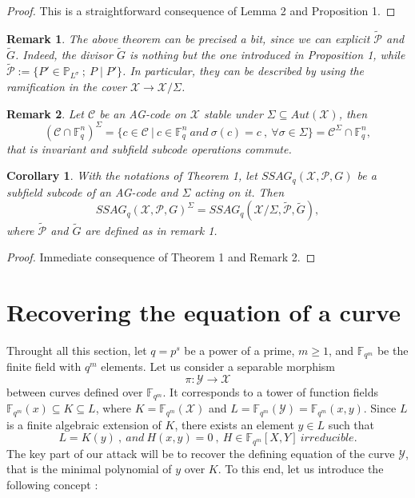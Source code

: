 \documentclass[10pt]{article}
\newtheorem{coro1}{Corollary}[]
\newtheorem{rq1}{Remark}[]
\newcommand{\s}{\vspace{0.3cm}}
\newcommand{\fqm}{\mathbb{F}_{q^m}}
\newcommand{\fq}{\mathbb{F}_q}
\newcommand{\su}{\subseteq}
\newcommand{\X}{\mathcal{X}}
\newcommand{\Y}{\mathcal{Y}}
\newcommand{\PR}{\mathcal{P}}
\begin{document}
\s
 
\begin{proof}
This is a straightforward consequence of Lemma 2 and Proposition 1.
\end{proof}

\s


\begin{rq1} \rm
The above theorem can be precised a bit, since we can explicit $\tilde{\PR}$ and $\tilde{G}$. Indeed, the divisor $\tilde{G}$ is nothing but the one introduced in Proposition 1, while $\tilde{\PR} := \{P' \in \mathbb{P}_{L^{\sigma}} \ ; \ P \mid P'\}$. In particular, they can be described by using the ramification in the cover $\X \rightarrow \X/\Sigma$.
\end{rq1}

\s

\begin{rq1} \rm
Let $\mathcal{C}$ be an AG-code on $\X$ stable under $\Sigma \su Aut(\X)$, then
\[(\mathcal{C}\cap \fq^n)^{\Sigma} = \{c \in \mathcal{C} \ | \ c \in \fq^n \ and \ \sigma(c)=c \ , \ \forall \sigma \in \Sigma\} = \mathcal{C}^{\Sigma} \cap \fq^n,\]
that is invariant and subfield subcode operations commute.
\end{rq1}

\s

\begin{coro1}
With the notations of Theorem 1, let $SSAG_q(\X,\PR,G)$ be a subfield subcode of an AG-code and $\Sigma$ acting on it. Then 
\[SSAG_q(\X,\PR,G)^{\Sigma} = SSAG_q(\X/\Sigma,\tilde{\PR},\tilde{G}),\]
where $\tilde{\PR}$ and $\tilde{G}$ are defined as in remark 1.
\end{coro1}

\s

\begin{proof}
Immediate consequence of Theorem 1 and Remark 2.
\end{proof}

\s

\section{Recovering the equation of a curve}


\s

Throught all this section, let $q=p^s$ be a power of a prime, $m \geq 1$, and $\fqm$ be the finite field with $q^m$ elements. Let us consider a separable morphism 
\[\pi : \Y \rightarrow \X\]
between curves defined over $\fqm$. It corresponds to a tower of function fields $\fqm(x) \su K \su L$, where $K=\fqm(\X)$ and $L=\fqm(\Y)=\fqm(x,y)$. Since $L$ is a finite  algebraic extension of $K$, there exists an element $y \in L$ such that 
\[L = K(y) \ , \ and \ H(x,y)=0 \ , \ H \in \fqm[X,Y] \ irreducible.\]
The key part of our attack will be to recover the defining equation of the curve $\Y$, that is the minimal polynomial of $y$ over $K$. To this end, let us introduce the following concept :
\end{document}
